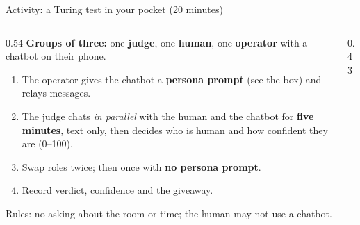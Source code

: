 \begin{frame}{Activity: a Turing test in your pocket (20 minutes)}
\begin{columns}[T]
\begin{column}{0.54\textwidth}
\small
\textbf{Groups of three:} one \textbf{judge}, one \textbf{human}, one \textbf{operator} with a chatbot on their phone.
\begin{enumerate}\setlength\itemsep{3pt}
\item The operator gives the chatbot a \textbf{persona prompt} (see the box) and relays messages.
\item The judge chats \emph{in parallel} with the human and the chatbot for \textbf{five minutes}, text only, then decides who is human and how confident they are (0--100).
\item Swap roles twice; then once with \textbf{no persona prompt}.
\item Record verdict, confidence and the giveaway.
\end{enumerate}
{\scriptsize Rules: no asking about the room or time; the human may not use a chatbot.}
\end{column}
\begin{column}{0.43\textwidth}
\vspace{2mm}\par
{}
\end{column}
\end{columns}
\end{frame}

